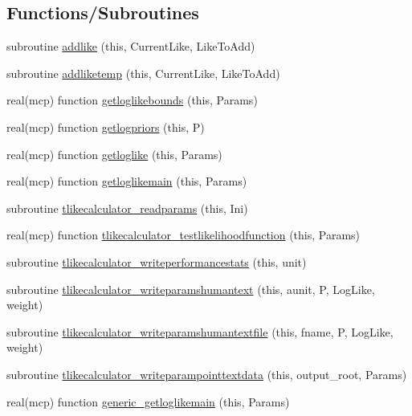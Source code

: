 \subsection*{Functions/\+Subroutines}
\begin{DoxyCompactItemize}
\item 
subroutine \mbox{\hyperlink{namespacecalclike_a36076b04960c7a7230a45fc468f9f0d6}{addlike}} (this, Current\+Like, Like\+To\+Add)
\item 
subroutine \mbox{\hyperlink{namespacecalclike_adb9f063355d18b2a50d8e0d3c061324b}{addliketemp}} (this, Current\+Like, Like\+To\+Add)
\item 
real(mcp) function \mbox{\hyperlink{namespacecalclike_ae4302a1d96dcdf7816b3d66125504644}{getloglikebounds}} (this, Params)
\item 
real(mcp) function \mbox{\hyperlink{namespacecalclike_ae8f9437d9cf6441647020ac8e419e424}{getlogpriors}} (this, P)
\item 
real(mcp) function \mbox{\hyperlink{namespacecalclike_a1a9de6819dc2b41653d5bf9a36bd66a1}{getloglike}} (this, Params)
\item 
real(mcp) function \mbox{\hyperlink{namespacecalclike_a7f2306f2a9d2d0135d6f4852f6ed3bc2}{getloglikemain}} (this, Params)
\item 
subroutine \mbox{\hyperlink{namespacecalclike_af377ac1f0746c42a430094fe73246012}{tlikecalculator\+\_\+readparams}} (this, Ini)
\item 
real(mcp) function \mbox{\hyperlink{namespacecalclike_adb41feb15d07d744bace1629aea8a5d3}{tlikecalculator\+\_\+testlikelihoodfunction}} (this, Params)
\item 
subroutine \mbox{\hyperlink{namespacecalclike_a5158b85ddca7d8f1b417a813bb7fe849}{tlikecalculator\+\_\+writeperformancestats}} (this, unit)
\item 
subroutine \mbox{\hyperlink{namespacecalclike_a7348b373c8c9138f0c694ad9969fcb66}{tlikecalculator\+\_\+writeparamshumantext}} (this, aunit, P, Log\+Like, weight)
\item 
subroutine \mbox{\hyperlink{namespacecalclike_afd9d4013e29fb891f656598d4b5e1b73}{tlikecalculator\+\_\+writeparamshumantextfile}} (this, fname, P, Log\+Like, weight)
\item 
subroutine \mbox{\hyperlink{namespacecalclike_a4be845214aaba0f4348b66c67401f78b}{tlikecalculator\+\_\+writeparampointtextdata}} (this, output\+\_\+root, Params)
\item 
real(mcp) function \mbox{\hyperlink{namespacecalclike_ab9a99016f525f639358a942fb9885cc7}{generic\+\_\+getloglikemain}} (this, Params)

\end{DoxyCompactItemize}

